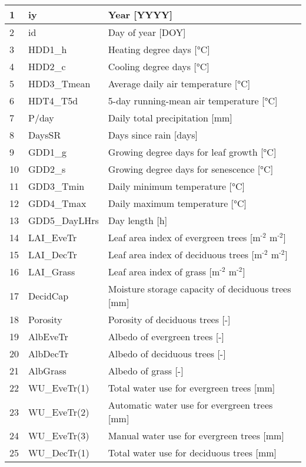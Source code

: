 \documentclass[letterpaper,10pt,english]{sphinxmanual}
\begin{document}
\begin{savenotes}
\begin{longtable}{|l|l|l|}
1
&
iy
&
Year {[}YYYY{]}
\\
\hline
2
&
id
&
Day of year {[}DOY{]}
\\
\hline
3
&
HDD1\_h
&
Heating degree days {[}°C{]}
\\
\hline
4
&
HDD2\_c
&
Cooling degree days {[}°C{]}
\\
\hline
5
&
HDD3\_Tmean
&
Average daily air temperature {[}°C{]}
\\
\hline
6
&
HDT4\_T5d
&
5-day running-mean air temperature {[}°C{]}
\\
\hline
7
&
P/day
&
Daily total precipitation {[}mm{]}
\\
\hline
8
&
DaysSR
&
Days since rain {[}days{]}
\\
\hline
9
&
GDD1\_g
&
Growing degree days for leaf growth {[}°C{]}
\\
\hline
10
&
GDD2\_s
&
Growing degree days for senescence {[}°C{]}
\\
\hline
11
&
GDD3\_Tmin
&
Daily minimum temperature {[}°C{]}
\\
\hline
12
&
GDD4\_Tmax
&
Daily maximum temperature {[}°C{]}
\\
\hline
13
&
GDD5\_DayLHrs
&
Day length {[}h{]}
\\
\hline
14
&
LAI\_EveTr
&
Leaf area index of evergreen trees {[}m$^{\text{-2}}$ m$^{\text{-2}}${]}
\\
\hline
15
&
LAI\_DecTr
&
Leaf area index of deciduous trees {[}m$^{\text{-2}}$ m$^{\text{-2}}${]}
\\
\hline
16
&
LAI\_Grass
&
Leaf area index of grass {[}m$^{\text{-2}}$ m$^{\text{-2}}${]}
\\
\hline
17
&
DecidCap
&
Moisture storage capacity of deciduous trees {[}mm{]}
\\
\hline
18
&
Porosity
&
Porosity of deciduous trees {[}-{]}
\\
\hline
19
&
AlbEveTr
&
Albedo of evergreen trees {[}-{]}
\\
\hline
20
&
AlbDecTr
&
Albedo of deciduous trees {[}-{]}
\\
\hline
21
&
AlbGrass
&
Albedo of grass {[}-{]}
\\
\hline
22
&
WU\_EveTr(1)
&
Total water use for evergreen trees {[}mm{]}
\\
\hline
23
&
WU\_EveTr(2)
&
Automatic water use for evergreen trees {[}mm{]}
\\
\hline
24
&
WU\_EveTr(3)
&
Manual water use for evergreen trees {[}mm{]}
\\
\hline
25
&
WU\_DecTr(1)
&
Total water use for deciduous trees {[}mm{]}

\end{longtable}
\end{savenotes}
\end{document}
